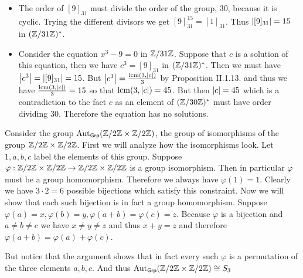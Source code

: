 \begin{problem}
\end{problem}

\begin{solution}
	\begin{itemize}
		\item The order of $[9]_{31}$ must divide the order of the group, $30$, because it is cyclic. Trying the different divisors we get $[9]^{15}_{31} = [1]_{31}$. Thus $\left|[9]_{31}\right| = 15$ in $(\mathbb{Z}/31\mathbb{Z})^*$.
		\item Consider the equation $x^3 - 9 = 0$ in $\mathbb{Z}/31\mathbb{Z}$. Suppose that $c$ is a solution of this equation, then we have $c^3 = [9]_{31}$ in $(\mathbb{Z}/31\mathbb{Z})^*$. Then we must have $\left|c^3\right| = \left|[9]_{31}\right| = 15$. But $\left|c^3\right| = \frac{\operatorname{lcm}(3, \left|c\right|)}{3}$ by Proposition II.1.13. and thus we have $\frac{\operatorname{lcm}(3, \left|c\right|)}{3} = 15$ so that $\operatorname{lcm}(3, \left|c\right|) = 45$. But then $\left|c\right| = 45$ which is a contradiction to the fact $c$ as an element of $(\mathbb{Z}/30\mathbb{Z})^*$ must have order dividing $30$. Therefore the equation has no solutions. \qedhere
	\end{itemize}
\end{solution}

\begin{problem}
\end{problem}

\begin{solution}
	Consider the group $\mathrm{Aut}_{\mathsf{Grp}}(\mathbb{Z}/2\mathbb{Z} \times \mathbb{Z}/2\mathbb{Z})$, the group of isomorphisms of the group $\mathbb{Z}/2\mathbb{Z} \times \mathbb{Z}/2\mathbb{Z}$. First we will analyze how the isomorphisms look. Let $1, a, b, c$ label the elements of this group. Suppose $\varphi: \mathbb{Z}/2\mathbb{Z} \times \mathbb{Z}/2\mathbb{Z} \to \mathbb{Z}/2\mathbb{Z} \times \mathbb{Z}/2\mathbb{Z}$ is a group isomorphism. Then in particular $\varphi$ must be a group homomorphism. Therefore we always have $\varphi(1) = 1$. Clearly we have $3 \cdot 2 = 6$ possible bijections which satisfy this constraint. Now we will show that each such bijection is in fact a group homomorphism. Suppose $\varphi(a) = x, \varphi(b) = y, \varphi(a + b) = \varphi(c) = z$. Because $\varphi$ is a bijection and $a \neq b \neq c$ we have $x \neq y \neq z$ and thus $x + y = z$ and therefore $\varphi(a + b) = \varphi(a) + \varphi(c)$.
	
	But notice that the argument shows that in fact every such $\varphi$ is a permutation of the three elements $a, b, c$. And thus $\mathrm{Aut}_{\mathsf{Grp}}(\mathbb{Z}/2\mathbb{Z} \times \mathbb{Z}/2\mathbb{Z}) \cong S_3$
\end{solution}

\begin{problem}
\end{problem}

